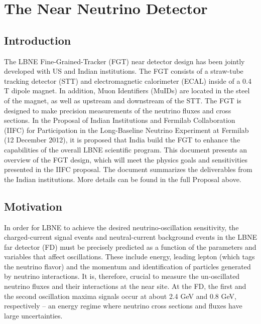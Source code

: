 
\chapter{The Near Neutrino Detector}

\section{Introduction} 


The LBNE Fine-Grained-Tracker (FGT) near detector design has been jointly
developed with US and Indian institutions. The FGT consists of a straw-tube
tracking detector (STT) and electromagnetic calorimeter (ECAL) inside of a 0.4 T
dipole magnet. In addition, Muon Identifiers (MuIDs) are located in the
steel of the magnet, as well as upstream and downstream of the STT. The FGT
is designed to make precision measurements of the neutrino fluxes and 
cross sections. 
In the Proposal of Indian Institutions and Fermilab Collaboration (IIFC) for Participation in 
the Long-Baseline Neutrino Experiment at Fermilab 
(12 December 2012), it is proposed that India build the FGT to enhance the capabilities of the 
overall LBNE scientific program. 
This document presents an overview of the FGT design, which 
will meet the physics goals and sensitivities presented in the IIFC proposal. The document 
summarizes the deliverables from the Indian institutions. More details can be found in the full Proposal above.

\section{Motivation}

In order for LBNE to achieve the desired neutrino-oscillation sensitivity, the 
charged-current signal events
and neutral-current
background events in the LBNE far detector (FD) must be precisely 
predicted as a function of the parameters and variables that affect 
oscillations. These include energy, leading lepton (which tags the neutrino flavor) and the 
momentum and identification of particles generated by neutrino interactions. 
It is, therefore, crucial to measure the un-oscillated neutrino fluxes and 
their interactions at the near site. At the FD, the first and the second 
oscillation maxima signals occur at about 2.4 GeV and 0.8 GeV, respectively 
-- an energy regime where neutrino cross sections and fluxes have large 
uncertainties. 

